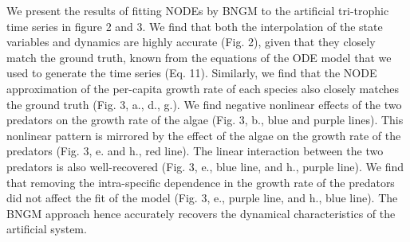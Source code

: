 \documentclass[11pt, oneside]{article}
\begin{document}
We present the results of fitting NODEs by BNGM to the artificial tri-trophic time series in figure 2 and 3.
We find that both the interpolation of the state variables and dynamics are highly accurate (Fig. 2), given that they closely match the ground truth, known from the equations of the ODE model that we used to generate the time series (Eq. 11).
Similarly, we find that the NODE approximation of the per-capita growth rate of each species also closely matches the ground truth (Fig. 3, a., d., g.). 
We find negative nonlinear effects of the two predators on the growth rate of the algae (Fig. 3, b., blue and purple lines).
This nonlinear pattern is mirrored by the effect of the algae on the growth rate of the predators (Fig. 3, e. and h., red line).
The linear interaction between the two predators is also well-recovered (Fig. 3, e., blue line, and h., purple line).
We find that removing the intra-specific dependence in the growth rate of the predators did not affect the fit of the model (Fig. 3, e., purple line, and h., blue line).
The BNGM approach hence accurately recovers the dynamical characteristics of the artificial system.
\end{document}
